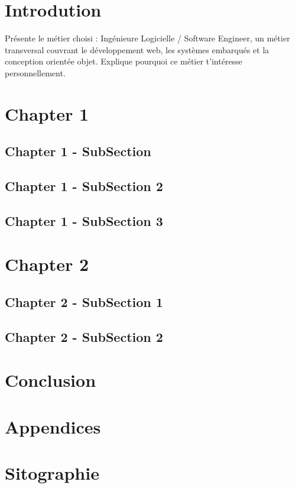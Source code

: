 \section*{Introdution}

Présente le métier choisi : Ingénieure Logicielle / Software Engineer, un métier transversal couvrant le développement web, les systèmes embarqués et la conception orientée objet. Explique pourquoi ce métier t'intéresse personnellement.

\newpage

\section*{Chapter 1}

\subsection*{Chapter 1 - SubSection}
{}

\subsection*{Chapter 1 - SubSection 2}
{}

\subsection*{Chapter 1 - SubSection 3}
{}

\newpage

\section*{Chapter 2}

\subsection*{Chapter 2 - SubSection 1}
{}

\subsection*{Chapter 2 - SubSection 2}
{}

\newpage

\section*{Conclusion}

\newpage

\section*{Appendices}

\newpage

\section*{Sitographie}
